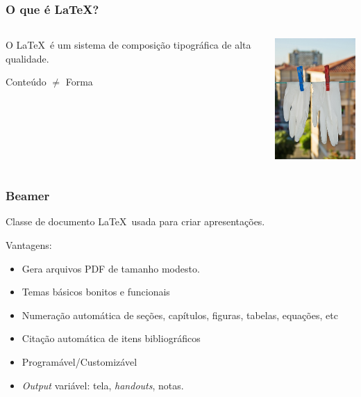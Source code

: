 \documentclass{beamer}
\begin{document}
\begin{frame}
   \frametitle{O que é \LaTeX ?}
   \begin{columns}
      \column{6cm}
      \begin{overlayarea}{6cm}{7cm}
         O \LaTeX\ é um sistema de composição tipográfica de alta qualidade.

         \begin{center}
            \begin{block}{}
               \begin{center}
                  Conteúdo $\ne$ Forma
               \end{center}
            \end{block}
         \end{center}         
         \vspace{1cm}
         \begin{center}
         \end{center}
      \end{overlayarea}
      \column{3.5cm}
      \begin{center}
         \includegraphics[width=3.5cm]{imagens/latex.jpg}
      \end{center}
   \end{columns}
\end{frame}

\begin{frame}
   \frametitle{Beamer}
   \begin{block}{}
      Classe de documento \LaTeX\ usada para criar apresentações.
   \end{block}
   \vspace{0.5cm}
   Vantagens:
   \begin{itemize}
      \item<2-> Gera arquivos PDF de tamanho modesto.
      \item<3-> Temas básicos bonitos e funcionais
      \item<4-> Numeração automática de seções, capítulos, figuras, tabelas, equações, etc
      \item<5-> Citação automática de itens bibliográficos
      \item<6-> Programável/Customizável
      \item<7> \emph{Output} variável: tela, \emph{handouts}, notas.
   \end{itemize}
\end{frame}
\end{document}
